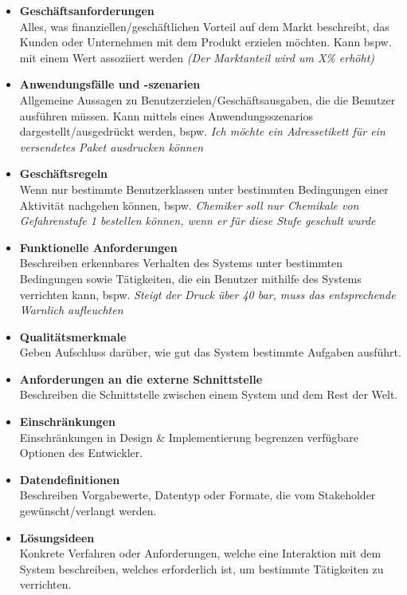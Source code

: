 \documentclass[a4paper]{article}
\begin{document}
		\begin{itemize}
			\item \textbf{Geschäftsanforderungen}\\
			Alles, was finanziellen/geschäftlichen Vorteil auf dem Markt beschreibt, das Kunden oder Unternehmen mit dem Produkt erzielen möchten.
			Kann bspw. mit einem Wert assoziiert werden \textit{(Der Marktanteil wird um X\% erhöht)}
			\item \textbf{Anwendungsfälle und -szenarien}\\
			Allgemeine Aussagen zu Benutzerzielen/Geschäftsausgaben, die die Benutzer ausführen müssen.
			Kann mittels eines Anwendungsszenarios dargestellt/ausgedrückt werden, bspw. \textit{Ich möchte ein Adressetikett für ein versendetes Paket ausdrucken können}
			\item \textbf{Geschäftsregeln}\\
			Wenn nur bestimmte Benutzerklassen unter bestimmten Bedingungen einer Aktivität nachgehen können, bspw. \textit{Chemiker soll nur Chemikale von Gefahrenstufe 1 bestellen können, wenn er für diese Stufe geschult wurde}
			\item \textbf{Funktionelle Anforderungen}\\
			Beschreiben erkennbares Verhalten des Systems unter bestimmten Bedingungen sowie Tätigkeiten, die ein Benutzer mithilfe des Systems verrichten kann, bspw. \textit{Steigt der Druck über 40 bar, muss das entsprechende Warnlich aufleuchten}
			\item \textbf{Qualitätsmerkmale}\\
			Geben Aufschluss darüber, wie gut das System bestimmte Aufgaben ausführt.
			\item \textbf{Anforderungen an die externe Schnittstelle}\\
			Beschreiben die Schnittstelle zwischen einem System und dem Rest der Welt.
			\item \textbf{Einschränkungen}\\
			Einschränkungen in Design \& Implementierung begrenzen verfügbare Optionen des Entwickler.
			\item \textbf{Datendefinitionen}\\
			Beschreiben Vorgabewerte, Datentyp oder Formate, die vom Stakeholder gewünscht/verlangt werden.
			\item \textbf{Lösungsideen}\\
			Konkrete Verfahren oder Anforderungen, welche eine Interaktion mit dem System beschreiben, welches erforderlich ist, um bestimmte Tätigkeiten zu verrichten.
		\end{itemize}
	
\end{document}
